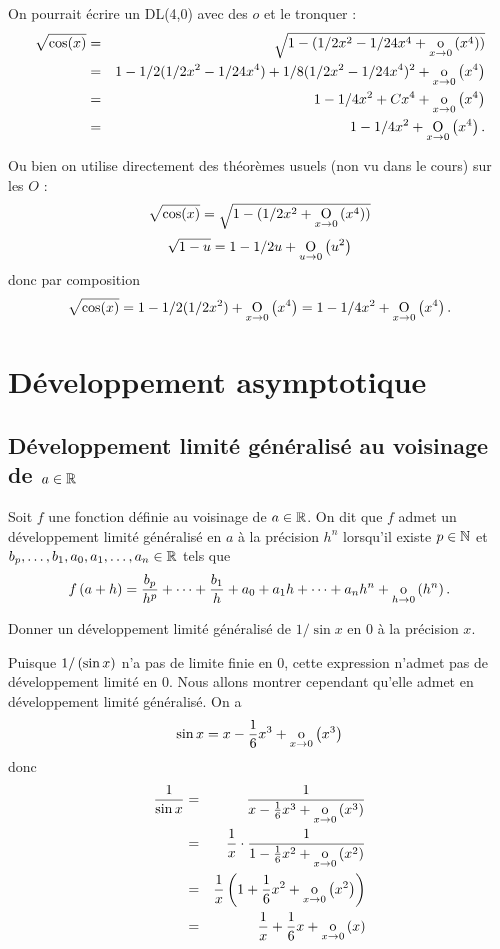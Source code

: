 \documentclass{magnolia}
\begin{document}
\begin{sol}
On pourrait écrire un DL(4,0) avec des $o$ et le tronquer :
\begin{eqnarray*}
\sqrt{\cos(x)}&=&\sqrt{1-(1/2x^2-1/24x^4+\underset{x \rightarrow 0}{\text{o}}\left(x^4\right))}\\
&=&1-1/2(1/2x^2-1/24x^4)+1/8(1/2x^2-1/24x^4)^2+\underset{x \rightarrow 0}{\text{o}}\left(x^4\right)\\
&=&1-1/4x^2+Cx^4+\underset{x \rightarrow 0}{\text{o}}\left(x^4\right)\\
&=&1-1/4x^2+\underset{x \rightarrow 0}{\text{O}}\left(x^4\right).
\end{eqnarray*}

Ou bien on utilise directement des théorèmes usuels (non vu dans le cours) sur les $O$ :
$$\sqrt{\cos(x)}=\sqrt{1-(1/2x^2+\underset{x \rightarrow 0}{\text{O}}\left(x^4\right))}$$
$$\sqrt{1-u}=1-1/2u+\underset{u \rightarrow 0}{\text{O}}\left(u^2\right)$$ donc par composition
$$\sqrt{\cos(x)}=1-1/2(1/2x^2)+\underset{x \rightarrow 0}{\text{O}}\left(x^4\right)=1-1/4x^2+\underset{x \rightarrow 0}{\text{O}}\left(x^4\right).$$
\end{sol}
\section{Développement asymptotique}

\subsection{Développement limité généralisé au voisinage de $a\in\mathbb{R}$}

\begin{definition}[utile=-3]
Soit $f$ une fonction définie au voisinage de $a\in\mathbb{R}$. On dit que $f$ admet
un développement limité généralisé en $a$ à la précision $h^n$
lorsqu'il existe $p\in\mathbb{N}$ et $b_p,\ldots,b_1,a_0,a_1,\ldots,a_n\in\mathbb{R}$ tels
que
\[f\left(a+h\right)=\frac{b_p}{h^p}+\cdots+\frac{b_1}{h}+a_0+a_1h+\cdots+a_nh^n
  +\underset{h \rightarrow 0}{\text{o}}\left(h^n\right).\]
\end{definition}

\begin{exoUnique}
\exo Donner un développement limité généralisé de $1/\sin x$ en 0 à
  la précision $x$.
  \begin{sol}
  Puisque $1/\left(\sin x\right)$ n'a pas de limite finie en 0, cette expression
  n'admet pas de développement limité en 0. Nous allons montrer cependant
  qu'elle admet en développement limité généralisé. On a
  \[\sin x=x-\frac{1}{6}x^3+\underset{x \rightarrow 0}{\text{o}}\left(x^3\right)\]
  donc
  \begin{eqnarray*}
  \frac{1}{\sin x}
  &=& \frac{1}{x-\frac{1}{6}x^3+\underset{x \rightarrow 0}{\text{o}}\left(x^3\right)}\\
  &=& \frac{1}{x}\cdot\frac{1}{1-\frac{1}{6}x^2+\underset{x \rightarrow 0}{\text{o}}\left(x^2\right)}\\
  &=& \frac{1}{x}\left(1+\frac{1}{6}x^2+\underset{x \rightarrow 0}{\text{o}}\left(x^2\right)\right)\\
  &=& \frac{1}{x}+\frac{1}{6}x+\underset{x \rightarrow 0}{\text{o}}\left(x\right)
  \end{eqnarray*}    
  \end{sol}
\end{exoUnique}
\end{document}
